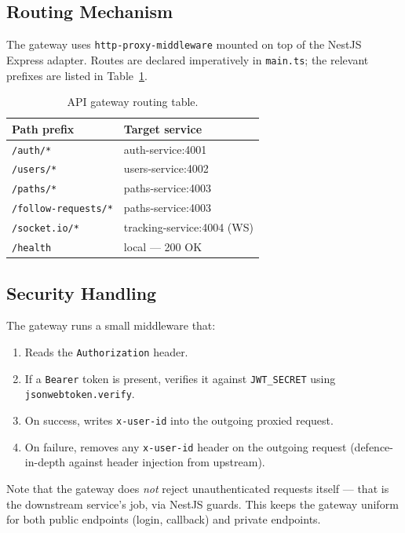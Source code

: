 \documentclass[11pt,a4paper]{article}
\begin{document}
\subsection{Routing Mechanism}
The gateway uses \texttt{http-proxy-middleware} mounted on top of the
NestJS Express adapter.  Routes are declared imperatively in
\texttt{main.ts}; the relevant prefixes are listed in
Table~\ref{tab:gw-routes}.

\begin{table}[h]
\centering
\small
\begin{tabular}{l l}
\toprule
\textbf{Path prefix} & \textbf{Target service} \\
\midrule
\texttt{/auth/*}             & auth-service:4001 \\
\texttt{/users/*}            & users-service:4002 \\
\texttt{/paths/*}            & paths-service:4003 \\
\texttt{/follow-requests/*}  & paths-service:4003 \\
\texttt{/socket.io/*}        & tracking-service:4004 (WS) \\
\texttt{/health}             & local — 200 OK \\
\bottomrule
\end{tabular}
\caption{API gateway routing table.}
\label{tab:gw-routes}
\end{table}

\subsection{Security Handling}
The gateway runs a small middleware that:

\begin{enumerate}[leftmargin=*]
  \item Reads the \texttt{Authorization} header.
  \item If a \texttt{Bearer} token is present, verifies it against
        \texttt{JWT\_SECRET} using \texttt{jsonwebtoken.verify}.
  \item On success, writes \texttt{x-user-id} into the outgoing
        proxied request.
  \item On failure, removes any \texttt{x-user-id} header on the
        outgoing request (defence-in-depth against header injection
        from upstream).
\end{enumerate}

Note that the gateway does \emph{not} reject unauthenticated requests
itself — that is the downstream service's job, via NestJS guards.
This keeps the gateway uniform for both public endpoints (login,
callback) and private endpoints.
\end{document}
